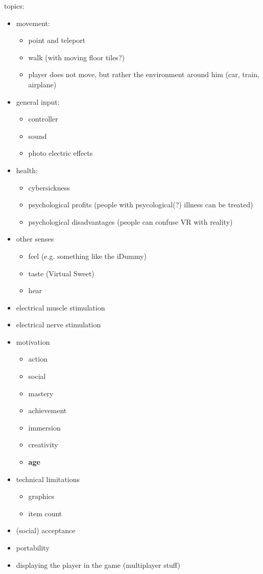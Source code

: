 \documentclass[chi_draft]{sigchi}
\begin{document}
topics: 
\begin{itemize}
	\item movement: 
	\begin{itemize}
		\item point and teleport
		\item walk (with moving floor tiles?)
		\item player does not move, but rather the environment around him (car, train, airplane)
	\end{itemize}
	\item general input: 
	\begin{itemize}
		\item controller
		\item sound
		\item photo electric effects
	\end{itemize}
	\item health: 
	\begin{itemize}
		\item cybersickness
		\item psychological profits (people with psycological(?) illness can be treated)
		\item psychological disadvantages (people can confuse VR with reality)
	\end{itemize}
	\item other senses
	\begin{itemize}
		\item feel (e.g. something like the iDummy)
		\item taste (Virtual Sweet)
		\item hear
	\end{itemize}
	\item electrical muscle stimulation
	\item electrical nerve stimulation
	\item motivation
	\begin{itemize}
		\item action
		\item social
		\item mastery
		\item achievement
		\item immersion
		\item creativity
		\item \textbf{age}
	\end{itemize}
	\item technical limitations
	\begin{itemize}
		\item graphics
		\item item count
	\end{itemize}
	\item (social) acceptance
	\item portability
	\item displaying the player in the game (multiplayer stuff)
\end{itemize}
\end{document}
